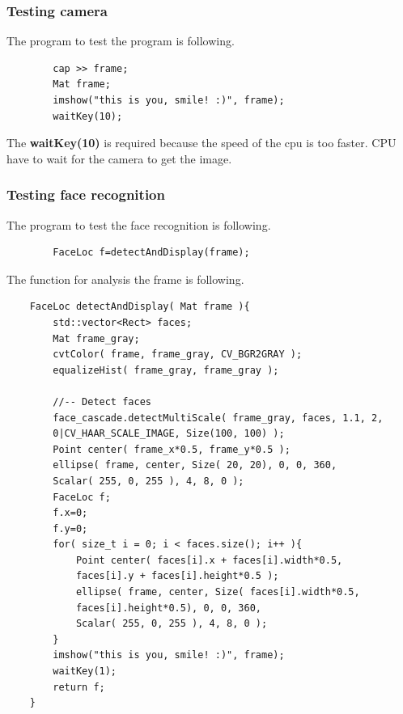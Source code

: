\documentclass{article}
\begin{document}
\subsubsection{Testing camera}
	The program to test the program is following.
	\begin{lstlisting}
		cap >> frame;
		Mat frame;
		imshow("this is you, smile! :)", frame);
		waitKey(10);
	\end{lstlisting}
	The \textbf{waitKey(10)} is required because the speed of the cpu is too faster. CPU have to wait for the camera to get the image.
\subsubsection{Testing face recognition}
	The program to test the face recognition is following.
	\begin{lstlisting}
		FaceLoc f=detectAndDisplay(frame);
	\end{lstlisting}
	The function for analysis the frame is following.
	\begin{lstlisting}
	FaceLoc detectAndDisplay( Mat frame ){
		std::vector<Rect> faces;
		Mat frame_gray;
		cvtColor( frame, frame_gray, CV_BGR2GRAY );
		equalizeHist( frame_gray, frame_gray );
		
		//-- Detect faces
		face_cascade.detectMultiScale( frame_gray, faces, 1.1, 2,
		0|CV_HAAR_SCALE_IMAGE, Size(100, 100) );
		Point center( frame_x*0.5, frame_y*0.5 );
		ellipse( frame, center, Size( 20, 20), 0, 0, 360, 
		Scalar( 255, 0, 255 ), 4, 8, 0 );
		FaceLoc f;
		f.x=0;
		f.y=0;
		for( size_t i = 0; i < faces.size(); i++ ){
			Point center( faces[i].x + faces[i].width*0.5,
			faces[i].y + faces[i].height*0.5 );
			ellipse( frame, center, Size( faces[i].width*0.5,
			faces[i].height*0.5), 0, 0, 360, 
			Scalar( 255, 0, 255 ), 4, 8, 0 );
		}
		imshow("this is you, smile! :)", frame);
		waitKey(1);
		return f;
	}
	\end{lstlisting}
\end{document}
